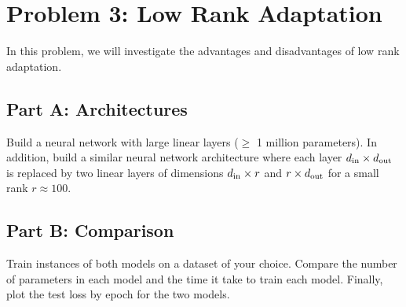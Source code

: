 \documentclass{article}
\begin{document}
\newpage
\section*{Problem 3: Low Rank Adaptation}

In this problem, we will investigate the advantages and disadvantages of low rank adaptation.

\subsection*{Part A: Architectures}

Build a neural network with large linear layers ($\geq$ 1 million parameters).
In addition, build a similar neural network architecture where each layer $d_\textnormal{in} \times d_\textnormal{out}$ is replaced by two linear layers of dimensions $d_\textnormal{in} \times r$ and $r \times d_\textnormal{out}$ for a small rank $r \approx 100$.

\subsection*{Part B: Comparison}

Train instances of both models on a dataset of your choice.
Compare the number of parameters in each model and the time it take to train each model.
Finally, plot the test loss by epoch for the two models.

%
\end{document}
